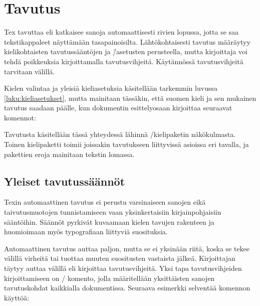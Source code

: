 \section{Tavutus}
\label{luku:tavutus}

Tex tavuttaa eli katkaisee sanoja automaattisesti rivien lopussa, jotta
se saa tekstikappaleet näyttämään tasapainoisilta. Lähtökohtaisesti
tavutus määräytyy kielikohtaisten tavutussääntöjen ja \=/asetusten
perusteella, mutta kirjoittaja voi tehdä poikkeuksia kirjoittamalla
tavutusvihjeitä. Käytännössä tavutusvihjeitä tarvitaan välillä.

Kielen valintaa ja yleisiä kieliasetuksia käsitellään tarkemmin luvussa
\ref{luku:kieliasetukset}, mutta mainitaan tässäkin, että suomen kieli
ja sen mukainen tavutus saadaan päälle, kun dokumentin esittelyosaan
kirjoittaa seuraavat komennot:

\begin{koodilohkosis}
  \usepackage{polyglossia}
  \setdefaultlanguage{finnish}
\end{koodilohkosis}

Tavutusta käsitellään tässä yhteydessä lähinnä
\-/kielipaketin näkökulmasta. Toinen kielipaketti
 toimii joissakin tavutukseen liittyvissä asioissa eri
tavalla, ja pakettien eroja mainitaan tekstin lomassa.

\subsection{Yleiset tavutussäännöt}

Texin automaattinen tavutus ei perustu varsinaiseen sanojen eikä
taivutusmuotojen tunnistamiseen vaan yksinkertaisiin kirjainpohjaisiin
sääntöihin. Säännöt pyrkivät kuvaamaan kielen tavujen rakenteen ja
huomioimaan myös typografiaan liittyviä suosituksia.

Automaattinen tavutus auttaa paljon, mutta se ei yksinään riitä, koska
se tekee välillä virheitä tai tuottaa muuten suositusten vastaista
jälkeä. Kirjoittajan täytyy auttaa välillä eli kirjoittaa
tavutusvihjeitä. Yksi tapa tavutusvihjeiden kirjoittamiseen on
\-/ komento, jolla määritellään yksittäisten
sanojen tavutuskohdat kaikkialla dokumentissa. Seuraava esimerkki
selventää komennon käyttöä:

\begin{koodilohkosis}
\end{koodilohkosis}


